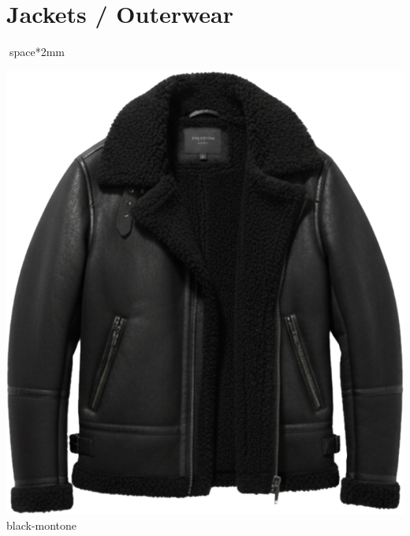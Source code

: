 \documentclass[10pt]{article}
\begin{document}
\section*{Jackets / Outerwear}space*{2mm}
\begin{minipage}[t]{0.22\textwidth}\centering\vspace{0mm}
\includegraphics[width=\linewidth,keepaspectratio]{assets/jackets/black-montone.png}\\
\vspace{0.5mm}\tiny black-montone\end{minipage}
\end{document}
